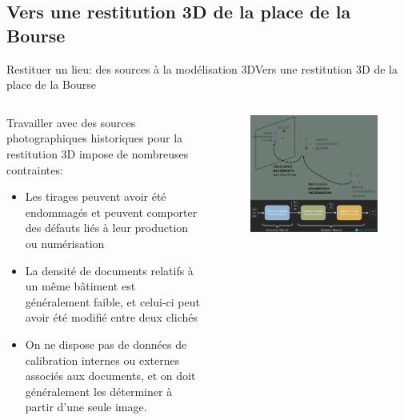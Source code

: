 \documentclass[8pt]{beamer}
\begin{document}
\subsection{Vers une restitution 3D de la place de la Bourse}
\begin{frame}{Restituer un lieu: des sources à la modélisation 3D}{Vers une restitution 3D de la place de la Bourse}
	\begin{columns}[c]
		\begin{column}{0.45\textwidth}
			Travailler avec des sources photographiques historiques pour la restitution 3D impose de nombreuses contraintes:
			\begin{itemize}
				\item Les tirages peuvent avoir été endommagés et peuvent comporter des défauts liés à leur production ou numérisation
				\item La densité de documents relatifs à un même bâtiment est généralement faible, et celui-ci peut avoir été modifié entre deux clichés
				\item On ne dispose pas de données de calibration internes ou externes associés aux documents, et on doit généralement les déterminer à partir d’une seule image.
			\end{itemize}
		\end{column}
		\begin{column}{0.55\textwidth}
			\begin{figure}
				\includegraphics[width=\textwidth]{includes/c_slide8.png}
			\end{figure}
		\end{column}
	\end{columns}
\end{frame}
\end{document}
